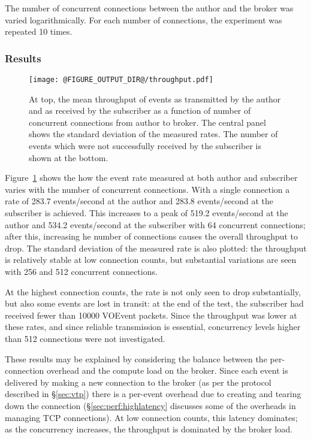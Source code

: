 \documentclass[5p,authoryear]{elsarticle}
\begin{document}
The number of concurrent connections between the author and the broker was
varied logarithmically. For each number of connections, the experiment was
repeated 10 times.

\subsubsection{Results}
\label{sec:perf:total:results}

\begin{figure}
  \begin{center}
  \texttt{[image: @FIGURE\_OUTPUT\_DIR@/throughput.pdf]}
  \end{center}

  \caption{At top, the mean throughput of events as transmitted by
  the author and as received by the subscriber as a function of number of
  concurrent connections from author to broker. The central panel shows the
  standard deviation of the measured rates. The number of events which were
  not successfully received by the subscriber is shown at the bottom.}

  \label{fig:throughput}
\end{figure}

Figure~\ref{fig:throughput} shows the how the event rate measured at both
author and subscriber varies with the number of concurrent connections. With a
single connection a rate of 283.7 events/second at the author and 283.8
events/second at the subscriber is achieved. This increases to a peak of 519.2
events/second at the author and 534.2 events/second at the subscriber with 64
concurrent connections; after this, increasing he number of connections causes
the overall throughput to drop. The standard deviation of the measured rate is
also plotted: the throughput is relatively stable at low connection counts,
but substantial variations are seen with 256 and 512 concurrent connections.

At the highest connection counts, the rate is not only seen to drop
substantially, but also some events are lost in transit: at the end of the
test, the subscriber had received fewer than 10000 VOEvent packets. Since the
throughput was lower at these rates, and since reliable transmission is
essential, concurrency levels higher than 512 connections were not
investigated.

These results may be explained by considering the balance between the
per-connection overhead and the compute load on the broker. Since each event
is delivered by making a new connection to the broker (as per the protocol
described in \S\ref{sec:vtp}) there is a per-event overhead due to creating
and tearing down the connection (\S\ref{sec:perf:highlatency} discusses some
of the overheads in managing TCP connections). At low connection counts, this
latency dominates; as the concurrency increases, the throughput is dominated
by the broker load.
\end{document}
